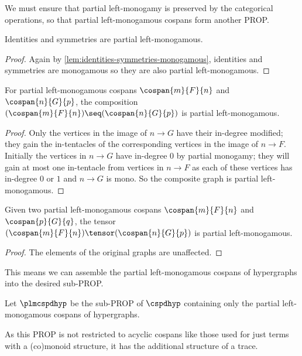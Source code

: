 We must ensure that partial left-monogamy is preserved by the categorical
operations, so that partial left-monogamous cospans form another PROP.

\begin{lemma}\label{lem:partial-monogamous-id-sym}
    Identities and symmetries are partial left-monogamous.
\end{lemma}
\begin{proof}
    Again by \cref{lem:identities-symmetries-monogamous}, identities and
    symmetries are monogamous so they are also partial left-monogamous.
\end{proof}

\begin{lemma}
    For partial left-monogamous cospans
    \(\cospan{m}{F}{n}\) and
    \(\cospan{n}{G}{p}\), the composition \(
    (\cospan{m}{F}{n})
    \seq
    (\cospan{n}{G}{p})
    \) is partial left-monogamous.
\end{lemma}
\begin{proof}
    Only the vertices in the image of \(n \to G\) have their in-degree modified;
    they gain the in-tentacles of the corresponding vertices in the image of
    \(n \to F\).
    Initially the vertices in \(n \to G\) have in-degree \(0\) by partial
    monogamy; they will gain at most one in-tentacle from vertices in
    \(n \to F\) as each of these vertices has in-degree \(0\) or \(1\) and
    \(n \to G\) is mono.
    So the composite graph is partial left-monogamous.
\end{proof}

\begin{lemma}
    Given two partial left-monogamous cospans \(\cospan{m}{F}{n}\)
    and \(\cospan{p}{G}{q}\), the tensor \(
    (\cospan{m}{F}{n})
    \tensor
    (\cospan{n}{G}{p})
    \) is partial left-monogamous.
\end{lemma}
\begin{proof}
    The elements of the original graphs are unaffected.
\end{proof}

This means we can assemble the partial left-monogamous cospans of hypergraphs
into the desired sub-PROP.

\begin{definition}
    Let \(\plmcspdhyp\) be the sub-PROP of \(\cspdhyp\) containing only the
    partial left-monogamous cospans of hypergraphs.
\end{definition}

As this PROP is not restricted to acyclic cospans like those used for just
terms with a (co)monoid structure, it has the additional structure of a trace.

